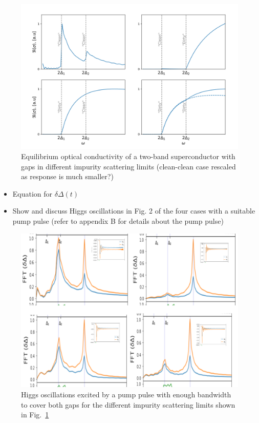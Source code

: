 \documentclass[aps,prb,reprint,noeprint,superscriptaddress]{revtex4-1}
\begin{document}
\begin{figure}[H]
    \centering
    \includegraphics[width=\columnwidth]{figures/two_band_cond.png}
    \caption{\label{fig:two_band_cond}%
    Equilibrium optical conductivity of a two-band superconductor with gaps in different impurity scattering limits (clean-clean case rescaled as response is much smaller?)}
\end{figure}%

\begin{itemize}
	\item Equation for $\delta\Delta(t)$
	\item Show and discuss Higgs oscillations in Fig. 2 of the four cases with a suitable pump pulse (refer to appendix B for details about the pump pulse)
\end{itemize}

\begin{figure}[H]
    \centering
    \includegraphics[width=\columnwidth]{figures/gap_osci.png}
    \caption{\label{fig:gap_osci}%
    Higgs oscillations excited by a pump pulse with enough bandwidth to cover both gaps for the different impurity scattering limits shown in Fig.~\ref{fig:two_band_cond}}
\end{figure}%
\end{document}

